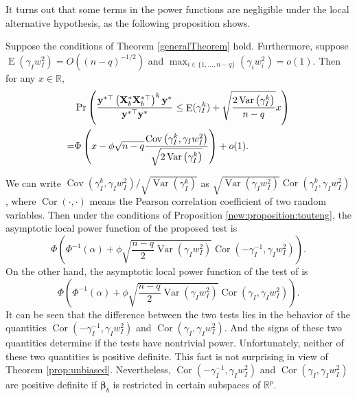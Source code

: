 \documentclass[smallextended]{svjour3}       %
\DeclareMathOperator{\myE}{E}
\DeclareMathOperator{\myVar}{Var}
\DeclareMathOperator{\myCov}{Cov}
\DeclareMathOperator{\myCor}{Cor}
\newcommand{\By}{\mathbf{y}}    \newcommand{\Bz}{\mathbf{z}}
\newcommand{\bfsym}[1]{\ensuremath{\boldsymbol{#1}}}
\def\bbeta{\bfsym \beta}
\begin{document}
It turns out that some terms in the power functions are negligible under the local alternative hypothesis, as the following proposition shows.
\begin{proposition}
    Suppose the conditions of Theorem \ref{generalTheorem} hold.
    Furthermore, suppose $\myE (\gamma_I w_I^2) = O((n-q)^{-1/2})$ and $\max_{i\in \{1, \dots, n-q\}} (\gamma_i w_i^2) = o(1)$.
Then for any $x\in \mathbb R$,
\begin{equation*}
    \begin{split}
    &\Pr\left( 
        \frac{
            \By^{*\top} \left( \BX_b^* \BX_b^{*\top} \right)^k \By^*
        }{
            \By^{*\top} \By^*
        } 
        \leq 
        \myE (\gamma_I^k)
        +\sqrt{
            \frac{2\myVar\left( \gamma_I^k \right)}{n-q} 
        }
        x
    \right) 
    \\
    =&
    \Phi\left( 
        x- \phi \sqrt{n-q} 
            \frac{
            \myCov\left( \gamma_I^k, \gamma_I w_I^2 \right)
            }{
\sqrt{2 \myVar\left( \gamma_I^k \right)}
}
    \right)
    +o(1)
    .
    \end{split}
\end{equation*}
    \label{new:proposition:touteng}
\end{proposition}
We can write $
            {
            \myCov\left( \gamma_I^k, \gamma_I w_I^2 \right)
            }/{
\sqrt{\myVar\left( \gamma_I^k \right)}
}
$ as $ \sqrt{\myVar(\gamma_I w_I^2)}\myCor(\gamma_I^k, \gamma_I w_I^2)$,
where $\myCor(\cdot, \cdot)$ means the Pearson correlation coefficient of two random variables.
Then under the conditions of Proposition \ref{new:proposition:touteng}, the asymptotic local power function of the proposed test is
\begin{equation*}
    \Phi\left(
        \Phi^{-1}(\alpha) + \phi \sqrt{\frac{n-q}{2}\myVar(\gamma_I w_I^2 )}    {\myCor(-\gamma_I^{-1}, \gamma_I w_I^2)}
    \right) 
    .
\end{equation*}
On the other hand, the asymptotic local power function of the test of \cite{Goeman2006} is
\begin{equation*}
    \Phi\left(
        \Phi^{-1}(\alpha) + \phi\sqrt{\frac{n-q}{2} {\myVar(\gamma_I w_I^2)}}   {\myCor(\gamma_I, \gamma_I w_I^2)}
    \right) 
    .
\end{equation*}
It can be seen that the difference between the two tests lies in the behavior of the quantities $\myCor (-\gamma_I^{-1}, \gamma_I w_I^2)$ and $\myCor(\gamma_I, \gamma_I w_I^2) $.  
And the signs of these two quantities determine if the tests have nontrivial power.
Unfortunately, neither of these two quantities is positive definite.
This fact is not surprising in view of Theorem \ref{prop:unbiased}.
Nevertheless, $\myCor (-\gamma_I^{-1}, \gamma_I w_I^2)$ and $\myCor(\gamma_I, \gamma_I w_I^2)$ are positive definite if $\bbeta_b$ is restricted  in certain subspaces of $\mathbb R^p$.
\end{document}
